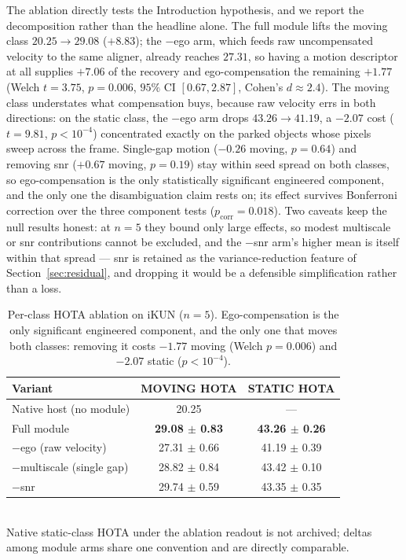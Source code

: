 \documentclass[sigconf,anonymous,nonacm]{acmart}
\begin{document}
The ablation directly tests the Introduction hypothesis, and we report the decomposition rather than the headline alone. The full module lifts the moving class $20.25\to29.08$ ($+8.83$); the $-$ego arm, which feeds raw uncompensated velocity to the same aligner, already reaches $27.31$, so having a motion descriptor at all supplies $+7.06$ of the recovery and ego-compensation the remaining $+1.77$ (Welch $t{=}3.75$, $p{=}0.006$, $95\%$ CI $[0.67, 2.87]$, Cohen's $d{\approx}2.4$). The moving class understates what compensation buys, because raw velocity errs in both directions: on the static class, the $-$ego arm drops $43.26\to41.19$, a $-2.07$ cost ($t{=}9.81$, $p{<}10^{-4}$) concentrated exactly on the parked objects whose pixels sweep across the frame. Single-gap motion ($-0.26$ moving, $p{=}0.64$) and removing snr ($+0.67$ moving, $p{=}0.19$) stay within seed spread on both classes, so ego-compensation is the only statistically significant engineered component, and the only one the disambiguation claim rests on; its effect survives Bonferroni correction over the three component tests ($p_{\mathrm{corr}}{=}0.018$). Two caveats keep the null results honest: at $n{=}5$ they bound only large effects, so modest multiscale or snr contributions cannot be excluded, and the $-$snr arm's higher mean is itself within that spread --- snr is retained as the variance-reduction feature of Section~\ref{sec:residual}, and dropping it would be a defensible simplification rather than a loss.

\begin{table}[t]
\centering
\caption{Per-class HOTA ablation on iKUN ($n{=}5$). Ego-compensation is the only significant engineered component, and the only one that moves both classes: removing it costs $-1.77$ moving (Welch $p{=}0.006$) and $-2.07$ static ($p{<}10^{-4}$).}
\label{tab:ablation}
\small
\begin{tabular}{lcc}
\toprule
Variant & MOVING HOTA & STATIC HOTA \\
\midrule
Native host (no module)           & 20.25 & --- \\
Full module                       & \textbf{29.08 $\pm$ 0.83} & \textbf{43.26 $\pm$ 0.26} \\
\;\;$-$ego (raw velocity)         & 27.31 $\pm$ 0.66 & 41.19 $\pm$ 0.39 \\
\;\;$-$multiscale (single gap)    & 28.82 $\pm$ 0.84 & 43.42 $\pm$ 0.10 \\
\;\;$-$snr                        & 29.74 $\pm$ 0.59 & 43.35 $\pm$ 0.35 \\
\bottomrule
\end{tabular}
\\[2pt]
{\footnotesize Native static-class HOTA under the ablation readout is not archived; deltas among module arms share one convention and are directly comparable.}
\end{table}
\end{document}
